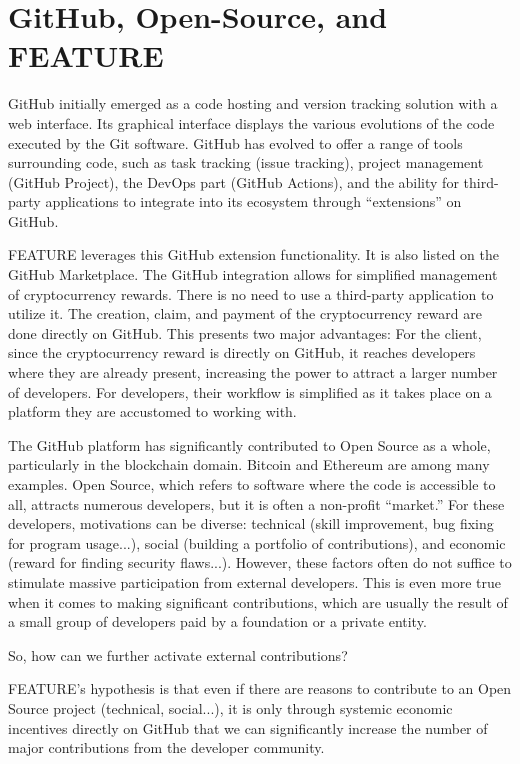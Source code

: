 \documentclass[
	a4paper, %
	10pt, %
	unnumberedsections, %
	twoside, %
]{LTJournalArticle}
\begin{document}

\section{GitHub, Open-Source, and FEATURE}

GitHub initially emerged as a code hosting and version tracking solution with a web interface. Its graphical interface displays the various evolutions of the code executed by the Git software. GitHub has evolved to offer a range of tools surrounding code, such as task tracking (issue tracking), project management (GitHub Project), the DevOps part (GitHub Actions), and the ability for third-party applications to integrate into its ecosystem through ``extensions'' on GitHub.

FEATURE leverages this GitHub extension functionality. It is also listed on the GitHub Marketplace. The GitHub integration allows for simplified management of cryptocurrency rewards. There is no need to use a third-party application to utilize it. The creation, claim, and payment of the cryptocurrency reward are done directly on GitHub. This presents two major advantages: For the client, since the cryptocurrency reward is directly on GitHub, it reaches developers where they are already present, increasing the power to attract a larger number of developers. For developers, their workflow is simplified as it takes place on a platform they are accustomed to working with.

The GitHub platform has significantly contributed to Open Source as a whole, particularly in the blockchain domain. Bitcoin and Ethereum are among many examples. Open Source, which refers to software where the code is accessible to all, attracts numerous developers, but it is often a non-profit ``market.'' For these developers, motivations can be diverse: technical (skill improvement, bug fixing for program usage...), social (building a portfolio of contributions), and economic (reward for finding security flaws...). However, these factors often do not suffice to stimulate massive participation from external developers. This is even more true when it comes to making significant contributions, which are usually the result of a small group of developers paid by a foundation or a private entity.

So, how can we further activate external contributions?

FEATURE's hypothesis is that even if there are reasons to contribute to an Open Source project (technical, social...), it is only through systemic economic incentives directly on GitHub that we can significantly increase the number of major contributions from the developer community.
\end{document}
